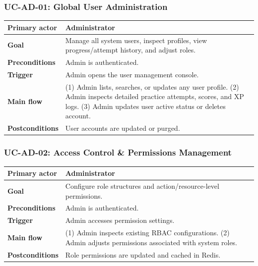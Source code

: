 \subsubsection{UC-AD-01: Global User Administration}
\begin{longtable}{L{0.28\textwidth}L{0.62\textwidth}}
\textbf{Primary actor} & Administrator \\ \hline
\textbf{Goal} & Manage all system users, inspect profiles, view progress/attempt history, and adjust roles. \\ \hline
\textbf{Preconditions} & Admin is authenticated. \\ \hline
\textbf{Trigger} & Admin opens the user management console. \\ \hline
\textbf{Main flow} & (1) Admin lists, searches, or updates any user profile. (2) Admin inspects detailed practice attempts, scores, and XP logs. (3) Admin updates user active status or deletes account. \\ \hline
\textbf{Postconditions} & User accounts are updated or purged. \\
\end{longtable}

\subsubsection{UC-AD-02: Access Control \& Permissions Management}
\begin{longtable}{L{0.28\textwidth}L{0.62\textwidth}}
\textbf{Primary actor} & Administrator \\ \hline
\textbf{Goal} & Configure role structures and action/resource-level permissions. \\ \hline
\textbf{Preconditions} & Admin is authenticated. \\ \hline
\textbf{Trigger} & Admin accesses permission settings. \\ \hline
\textbf{Main flow} & (1) Admin inspects existing RBAC configurations. (2) Admin adjusts permissions associated with system roles. \\ \hline
\textbf{Postconditions} & Role permissions are updated and cached in Redis. \\
\end{longtable}

